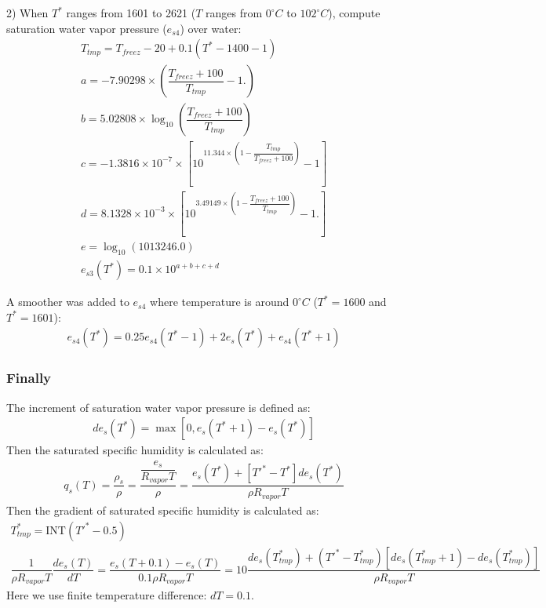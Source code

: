 \documentclass[letterpaper,titlepage,10pt]{article}
\numberwithin{equation}{section}
\begin{document}
2) When $T^*$ ranges from 1601 to 2621 ($T$ ranges from $0^\circ C$ to $102^\circ C$), compute saturation water vapor pressure ($e_{s4}$) over water:
\begin{gather}
	T_{tmp} = T_{freez} - 20 + 0.1\left( T^* - 1400 - 1 \right) \\
	a = - 7.90298 \times \left(\dfrac{T_{freez} + 100}{T_{tmp}} - 1. \right) \\
	b = 5.02808 \times \log_{10} \left(\dfrac{T_{freez} + 100}{T_{tmp}} \right) \\
	c = - 1.3816 \times 10^{-7} \times \left[10^{11.344 \times \left(1 - \dfrac{T_{tmp}}{T_{freez} + 100} \right)} - 1 \right] \\
	d = 8.1328 \times 10^{-3} \times \left[10^{3.49149 \times \left(1 - \dfrac{T_{freez} + 100}{T_{tmp}} \right)} - 1. \right] \\
	e = \log_{10} \left(1013246.0 \right) \\
	e_{s3}(T^*) = 0.1 \times 10^{a + b + c + d}
\end{gather}

A smoother was added to $e_{s4}$ where temperature is around $0^\circ C$ ($T^* = 1600$ and $T^* = 1601$):
\begin{gather}
	e_{s4}(T^*) = 0.25 e_{s4}(T^*-1) + 2 e_s(T^*) + e_{s4}(T^*+1)
\end{gather}


\subsubsection*{Finally}

The increment of saturation water vapor pressure is defined as:
\begin{gather}
	de_{s}(T^*) = \max \left[0, e_{s}(T^*+1) - e_{s}(T^*) \right]
\end{gather}
Then the saturated specific humidity is calculated as:
\begin{gather}
	q_{s}(T) = \dfrac{\rho_{s}}{\rho} = \dfrac{\dfrac{e_s}{R_{vapor}T}}{\rho} = \dfrac{e_{s}(T^*) + \left[T'^* - T^* \right] de_{s}(T^*)}{\rho R_{vapor} T}
\end{gather}
Then the gradient of saturated specific humidity is calculated as:
\begin{gather}
	T^*_{tmp} = \textrm{INT} \left(T'^* - 0.5 \right) \\
	\dfrac{1}{\rho R_{vapor} T} \dfrac{de_{s}(T)}{dT} = \dfrac{e_{s}(T + 0.1) - e_{s}(T)}{0.1 \rho R_{vapor} T} = 10 \dfrac{de_{s}(T^*_{tmp}) + \left(T'^* - T^*_{tmp} \right)\left[de_{s}(T^*_{tmp} + 1) - de_{s}(T^*_{tmp}) \right]}{\rho R_{vapor} T}
\end{gather}
Here we use finite temperature difference: $dT = 0.1$.
\end{document}
